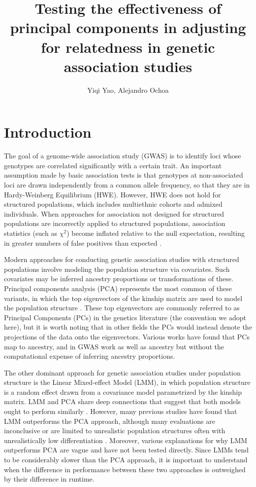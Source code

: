 \documentclass[12pt]{article}
\title{Testing the effectiveness of principal components in adjusting for relatedness in genetic association studies}
\author{Yiqi Yao, Alejandro Ochoa}
\begin{document}
\maketitle
	
\section{Introduction} 

The goal of a genome-wide association study (GWAS) is to identify loci whose genotypes are correlated significantly with a certain trait.
An important assumption made by basic association tests is that genotypes at non-associated loci are drawn independently from a common allele frequency, so that they are in Hardy-Weinberg Equilibrium (HWE).
However, HWE does not hold for structured populations, which includes multiethnic cohorts and admixed individuals.
When approaches for association not designed for structured populations are incorrectly applied to structured populations, association statistics (such as $\chi^2$) become inflated relative to the null expectation, resulting in greater numbers of false positives than expected \citep{devlin_genomic_1999, astle_population_2009}.

Modern approaches for conducting genetic association studies with structured populations involve modeling the population structure via covariates.
Such covariates may be inferred ancestry proportions \citep{pritchard_association_2000} or transformations of these.
Principal components analysis (PCA) represents the most common of these variants, in which the top eigenvectors of the kinship matrix are used to model the population structure \citep{price_principal_2006}.
These top eigenvectors are commonly referred to as Principal Components (PCs) in the genetics literature (the convention we adopt here), but it is worth noting that in other fields the PCs would instead denote the projections of the data onto the eigenvectors.
Various works have found that PCs map to ancestry, and in GWAS work as well as ancestry but without the computational expense of inferring ancestry proportions.

The other dominant approach for genetic association studies under population structure is the Linear Mixed-effect Model (LMM), in which population structure is a random effect drawn from a covariance model parametrized by the kinship matrix.
LMM and PCA share deep connections that suggest that both models ought to perform similarly \citep{hoffman_correcting_2013}.
However, many previous studies have found that LMM outperforms the PCA approach, although many evaluations are inconclusive or are limited to unrealistic population structures often with unrealistically low differentiation \citep{astle_population_2009, kang_variance_2010, wang_analytical_2013}.
Moreover, various explanations for why LMM outperforms PCA are vague and have not been tested directly.
Since LMMs tend to be considerably slower than the PCA approach, it is important to understand when the difference in performance between these two approaches is outweighed by their difference in runtime.
\end{document}
